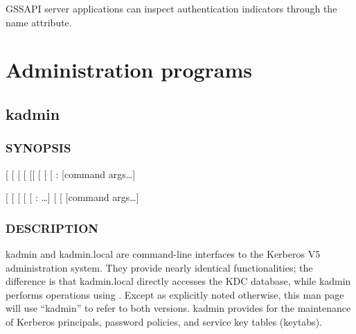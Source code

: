 \documentclass[letterpaper,10pt,english]{sphinxmanual}
\begin{document}
GSSAPI server applications can inspect authentication indicators
through the  name
attribute.


\chapter{Administration  programs}
\label{\detokenize{admin/admin_commands/index:administration-programs}}\label{\detokenize{admin/admin_commands/index::doc}}

\section{kadmin}
\label{\detokenize{admin/admin_commands/kadmin_local::doc}}\label{\detokenize{admin/admin_commands/kadmin_local:kadmin}}\label{\detokenize{admin/admin_commands/kadmin_local:kadmin-1}}

\subsection{SYNOPSIS}
\label{\detokenize{admin/admin_commands/kadmin_local:synopsis}}\label{\detokenize{admin/admin_commands/kadmin_local:kadmin-synopsis}}
{[}\textbar{}\sphinxstylestrong{-N}{]}
{[} \sphinxstyleemphasis{realm}{]}
{[} \sphinxstyleemphasis{principal}{]}
{[} \sphinxstyleemphasis{query}{]}
{[}{[} \sphinxstyleemphasis{cache\_name}{]}\textbar{}{[} {[} \sphinxstyleemphasis{keytab}{]}{]}\textbar{}\sphinxstylestrong{-n}{]}
{[} \sphinxstyleemphasis{password}{]}
{[} \sphinxstyleemphasis{admin\_server}{[}:\sphinxstyleemphasis{port}{]}{]}
{[}command args…{]}

{[} \sphinxstyleemphasis{realm}{]}
{[} \sphinxstyleemphasis{principal}{]}
{[} \sphinxstyleemphasis{query}{]}
{[} \sphinxstyleemphasis{dbname}{]}
{[} : …{]}
{[}\sphinxstylestrong{-m}{]}
{[} \sphinxstyleemphasis{db\_args}{]}
{[}command args…{]}


\subsection{DESCRIPTION}
\label{\detokenize{admin/admin_commands/kadmin_local:kadmin-synopsis-end}}\label{\detokenize{admin/admin_commands/kadmin_local:description}}
kadmin and kadmin.local are command-line interfaces to the Kerberos V5
administration system.  They provide nearly identical functionalities;
the difference is that kadmin.local directly accesses the KDC
database, while kadmin performs operations using {\hyperref[\detokenize{admin/admin_commands/kadmind:kadmind-8}]{}}.
Except as explicitly noted otherwise, this man page will use “kadmin”
to refer to both versions.  kadmin provides for the maintenance of
Kerberos principals, password policies, and service key tables
(keytabs).
\end{document}
